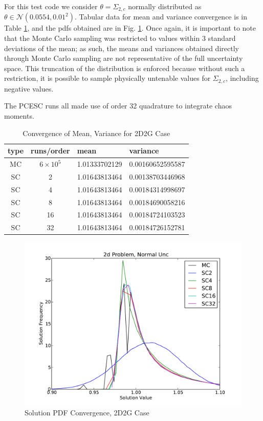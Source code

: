 For this test code we consider $\theta=\Sigma_{2,c}$ normally distributed as $\theta\in\mathcal{N}(0.0554,0.01^2)$. Tabular data for mean and variance convergence is in Table \ref{tab:2dcrit}, and the pdfs obtained are in Fig. \ref{fig:2dcrit}.  Once again, it is important to note that the Monte Carlo sampling was restricted to values within 3 standard deviations of the mean; as such, the means and variances obtained directly through Monte Carlo sampling are not representative of the full uncertainty space.  This truncation of the distribution is enforced because without such a restriction, it is possible to sample physically untenable values for $\Sigma_{2,c}$, including negative values.

The PCESC runs all made use of order 32 quadrature to integrate chaos moments.

\begin{table}
\begin{center}
\begin{tabular}{c c|l l}
type & runs/order & mean & variance \\ \hline
MC & $6\times10^5$ & 1.01333702129 & 0.00160652595587 \\
SC & 2  & 1.01643813464 & 0.00138703446968 \\
SC & 4  & 1.01643813464 & 0.00184314998697 \\
SC & 8  & 1.01643813464 & 0.00184690058216 \\
SC & 16 & 1.01643813464 & 0.00184724103523 \\
SC & 32 & 1.01643813464 & 0.00184726152781
\end{tabular}
\end{center}
\caption{Convergence of Mean, Variance for 2D2G Case}
\label{tab:2dcrit}
\end{table}

\begin{figure}[h!]
\centering
   \includegraphics[width=\textwidth]{../graphics/2d_normal_pdfs}
   \caption{Solution PDF Convergence, 2D2G Case}
   \label{fig:2dcrit}
\end{figure}


